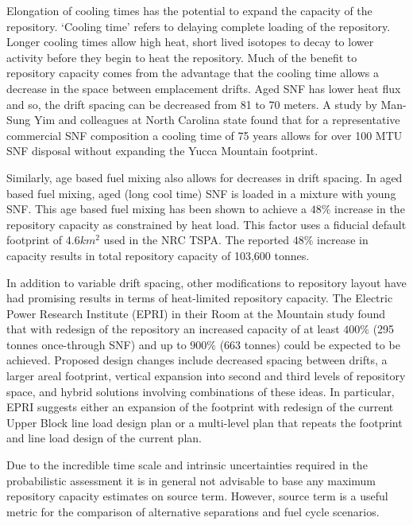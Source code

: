 Elongation of cooling times has the potential to expand the capacity 
of the repository. `Cooling time' refers to delaying complete loading 
of the repository. Longer cooling times allow high heat, short lived 
isotopes to decay to lower activity before they begin to heat the 
repository. Much of the benefit to repository capacity comes from the 
advantage that the cooling time allows a decrease in the space between 
emplacement drifts. Aged SNF has lower heat flux and so, the drift 
spacing can be decreased from 81 to 70 meters. A study by Man-Sung Yim 
and colleagues at North Carolina state found that for a representative 
commercial SNF composition a cooling time of 75 years allows for over 
100 MTU SNF disposal without expanding the Yucca Mountain 
footprint.\cite{li_examining_2007}

Similarly, age based fuel mixing also allows for decreases in drift 
spacing. In aged based fuel mixing, aged (long cool time) SNF is 
loaded in a mixture with young SNF. This age based fuel mixing has 
been shown to achieve a $48\%$ increase in the repository capacity as 
constrained by heat load.\cite{nicholson_thermal_2007} This factor 
uses a fiducial default footprint of $4.6 km^2$ used in the NRC TSPA.  
The reported $48\%$ increase in capacity results in total repository 
capacity of 103,600 tonnes.\cite{williams_contract_2001}

In addition to variable drift spacing, other modifications to 
repository layout have had promising results in terms of heat-limited 
repository capacity. The Electric Power Research Institute (EPRI) in 
their Room at the Mountain study found that with redesign of the 
repository an increased capacity of at least $400\%$ (295 tonnes 
once-through SNF) and up to $900\%$ (663 tonnes) could be expected to 
be achieved. Proposed design changes include decreased spacing between 
drifts, a larger areal footprint, vertical expansion into second and 
third levels of repository space, and hybrid solutions involving 
combinations of these ideas. In particular, EPRI suggests either an 
expansion of the footprint with redesign of the current Upper Block 
line load design plan or a multi-level plan that repeats the footprint 
and line load design of the current plan.\cite{kessler_room_2006}




Due to the incredible time scale and intrinsic uncertainties required 
in the probabilistic assessment it is in general not advisable to base 
any maximum repository capacity estimates on source term. However, 
source term is a useful metric for the comparison of alternative 
separations and fuel cycle scenarios.

